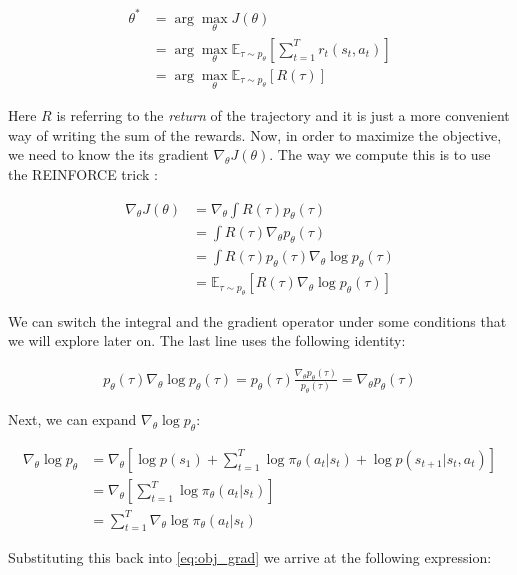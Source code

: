 \begin{align}
    \theta^* &= \arg\max_\theta J(\theta)\\
    &=  \arg\max_\theta \mathbb{E}_{\tau \sim p_\theta}\left[ \sum_{t=1}^{T} 
    r_t(s_t,a_t) \right] \\
    &= \arg\max_\theta \mathbb{E}_{\tau \sim p_\theta}\left[ R(\tau) \right]
\end{align}

Here $R$ is referring to the \textit{return} of the trajectory and it is just a more convenient way of writing the sum of the rewards. Now, in order to maximize the objective, we need to know the its gradient $\nabla_\theta J(\theta)$. The way we compute this is to use the REINFORCE trick :

\begin{align}
    \label{eq:obj_grad}
    \nabla_\theta J(\theta) &= \nabla_\theta \int R(\tau) p_\theta(\tau) \\
    &= \int R(\tau) \nabla_\theta p_\theta(\tau)\\
    &= \int R(\tau) p_\theta(\tau) \nabla_\theta \log p_\theta(\tau)\\
    &= \mathbb{E}_{\tau \sim p_\theta} \left[ R(\tau) \nabla_\theta \log p_\theta(\tau) \right]
\end{align}

We can switch the integral and the gradient operator under some conditions that we will explore later on. The last line uses the following identity:

\begin{align*}
    p_\theta(\tau)\nabla_\theta \log p_\theta(\tau) = p_\theta(\tau) \frac{\nabla_\theta p_\theta(\tau)}{p_\theta(\tau)} = \nabla_\theta p_\theta(\tau)
\end{align*}

Next, we can expand $\nabla_\theta \log p_\theta$:

\begin{align}
    \nabla_\theta \log p_\theta &= \nabla_\theta \left[ \log p(s_1) + \sum_{t=1}^T \log \pi_\theta(a_t|s_t) + \log p(s_{t+1} | s_t, a_t) \right]\\
    &= \nabla_\theta \left[ \sum_{t=1}^T \log \pi_\theta(a_t|s_t) \right]\\
    &= \sum_{t=1}^T \nabla_\theta \log \pi_\theta(a_t|s_t)
\end{align}

Substituting this back into \autoref{eq:obj_grad} we arrive at the following expression:

